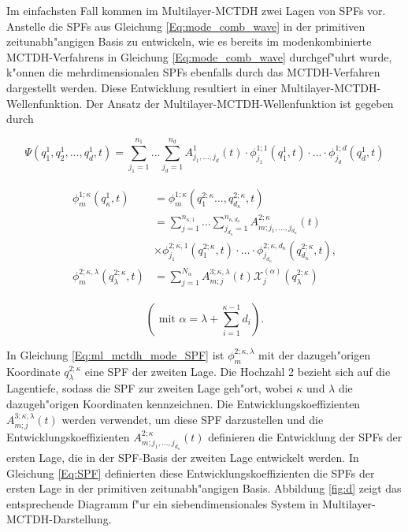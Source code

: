 Im einfachsten Fall kommen im Multilayer-MCTDH zwei Lagen von SPFs vor.
Anstelle die SPFs aus Gleichung \ref{Eq:mode_comb_wave} in der primitiven zeitunabh"angigen Basis zu entwickeln, wie es bereits
im modenkombinierte MCTDH-Verfahrens in Gleichung \ref{Eq:mode_comb_wave} durchgef"uhrt wurde,
k"onnen die mehrdimensionalen SPFs ebenfalls durch das MCTDH-Verfahren dargestellt werden.
Diese Entwicklung resultiert in einer Multilayer-MCTDH-Wellenfunktion. 
Der Ansatz der Multilayer-MCTDH-Wellenfunktion ist gegeben durch 

\begin{equation}
  \Psi(q^{1}_{1},q^{1}_{2},..., q^{1}_{d}, t)=\sum^{n_{1}}_{j_{1}=1} ... \sum^{n_{d}}_{j_{d}=1} A^{1}_{j_{1}, ..., j_{d}}(t)
  \cdot \phi^{1;1}_{j_{1}}(q^1_{1}, t) \cdot ... \cdot \phi^{1;d}_{j_{d}}(q^1_{d}, t)
  \label{Eq:ml_mctdh_wave}
  \end{equation}

\begin{align}
  \begin{split}
 \phi^{1;\kappa}_{m} (q^1_{\kappa}, t) & =  \phi^{1;\kappa}_{m} (q^{2;\kappa}_1..., q^{2;\kappa}_{d_{\kappa}},t)\\
 & = \sum^{n_{\kappa,1}}_{j=1} ... \sum^{n_{\kappa,d_\kappa}}_{j_{d_\kappa}=1} A^{2;\kappa}_{m;j_1,...,j_{d_\kappa}}(t) \\
 & \times \phi^{2;\kappa,1}_{j_1} (q^{2;\kappa}_{1}, t) \cdot ... \cdot
 \phi^{2;\kappa,d_\kappa}_{j_{d_\kappa}} (q^{2;\kappa}_{d_\kappa}, t),
\\
 \phi^{2;\kappa, \lambda}_{m} (q^{2;\kappa}_{\lambda}, t)&= \sum^{N_{\alpha}}_{j=1} A^{3;\kappa, \lambda}_{m;j}(t)
 \mathcal{X}^{(\alpha)}_{j}(q^{2;\kappa}_\lambda)
 \label{Eq:ml_mctdh_mode_SPF}
  \end{split}
 \end{align}

 \begin{equation}
  \left( \text{ mit } \alpha = \lambda + \sum^{\kappa - 1}_{i=1}d_i \right).
 \end{equation}

In Gleichung \ref{Eq:ml_mctdh_mode_SPF} ist $ \phi^{2;\kappa, \lambda}_{m}  $ 
mit der dazugeh"origen Koordinate $q^{2;\kappa}_\lambda$ eine SPF der zwei\-ten Lage.
Die Hochzahl 2 bezieht sich auf die Lagentiefe, sodass die SPF zur zweiten Lage geh"ort, 
wobei $\kappa$ und $\lambda$ die dazugeh"origen Koordinaten kennzeichnen.
Die Ent\-wicklungskoeffizienten $A^{3;\kappa, \lambda}_{m;j}(t) $ werden verwendet, um diese SPF darzustellen
und die Entwicklungskoeffizienten $A^{2;\kappa}_{m;j_1,...,j_{d_\kappa}}(t)$ definieren die Entwicklung der SPFs der ersten Lage, die
in der SPF-Basis der zweiten Lage entwickelt werden.
In Gleichung \ref{Eq:SPF} definier\-ten diese Entwicklungskoeffizienten die SPFs der ersten Lage in der primitiven zeitunabh"angigen Basis.
Abbildung \ref{fig:d} zeigt das entsprechende Diagramm f"ur ein siebendimensionales System in Multilayer-MCTDH-Darstellung.

